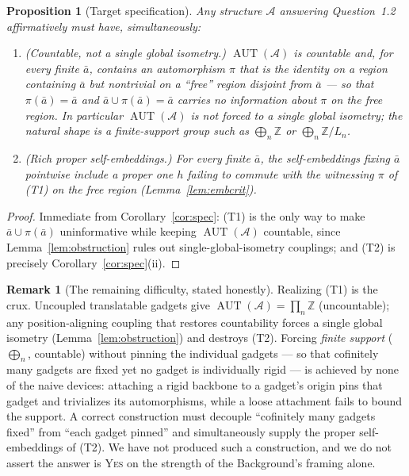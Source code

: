 \documentclass[12pt,fullpage]{article}
\newtheorem{proposition}[theorem]{Proposition}
\theoremstyle{definition}
\newtheorem{remark}[theorem]{Remark}
\newcommand{\A}{\mathcal{A}}
\newcommand{\Z}{{\mathbb{Z}}}
\newcommand{\AUT}{\operatorname{AUT}}
\begin{document}
\begin{proposition}[Target specification]\label{prop:target}
Any structure $\A$ answering Question~1.2 affirmatively must have, simultaneously:
\begin{enumerate}[label=\textup{(T\arabic*)}]
\item \emph{(Countable, not a single global isometry.)}  $\AUT(\A)$ is countable
  and, for every finite $\bar a$, contains an automorphism $\pi$ that is the
  identity on a region containing $\bar a$ but nontrivial on a ``free'' region
  disjoint from $\bar a$ --- so that $\pi(\bar a)=\bar a$ and
  $\bar a\cup\pi(\bar a)=\bar a$ carries no information about $\pi$ on the free
  region.  In particular $\AUT(\A)$ is \emph{not} forced to a single global
  isometry; the natural shape is a finite-support group such as
  $\bigoplus_n\Z$ or $\bigoplus_n\Z/L_n$.
\item \emph{(Rich proper self-embeddings.)}  For every finite $\bar a$, the
  self-embeddings fixing $\bar a$ pointwise include a proper one $h$ failing to
  commute with the witnessing $\pi$ of (T1) on the free region
  (Lemma~\ref{lem:embcrit}).
\end{enumerate}
\end{proposition}

\begin{proof}
Immediate from Corollary~\ref{cor:spec}: (T1) is the only way to make
$\bar a\cup\pi(\bar a)$ uninformative while keeping $\AUT(\A)$ countable, since
Lemma~\ref{lem:obstruction} rules out single-global-isometry couplings; and
(T2) is precisely Corollary~\ref{cor:spec}(ii).
\end{proof}

\begin{remark}[The remaining difficulty, stated honestly]\label{rem:open}
Realizing (T1) is the crux.  Uncoupled translatable gadgets give
$\AUT(\A)=\prod_n\Z$ (uncountable); any position-aligning coupling that restores
countability forces a single global isometry (Lemma~\ref{lem:obstruction}) and
destroys (T2).  Forcing \emph{finite support} ($\bigoplus_n$, countable) without
pinning the individual gadgets --- so that cofinitely many gadgets are fixed yet
no gadget is individually rigid --- is achieved by none of the naive devices:
attaching a rigid backbone to a gadget's origin pins that gadget and trivializes
its automorphisms, while a loose attachment fails to bound the support.  A
correct construction must decouple ``cofinitely many gadgets fixed'' from ``each
gadget pinned'' and simultaneously supply the proper self-embeddings of (T2).
We have not produced such a construction, and we do not assert the answer is
\textsc{Yes} on the strength of the Background's framing alone.
\end{remark}
\end{document}
